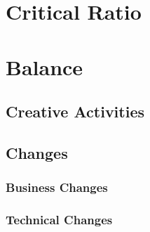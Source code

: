     \section{Critical Ratio} %

    \section{Balance} %

        \subsection{Creative Activities} %

        \subsection{Changes} %

            \subsubsection{Business Changes} %

            \subsubsection{Technical Changes} %
